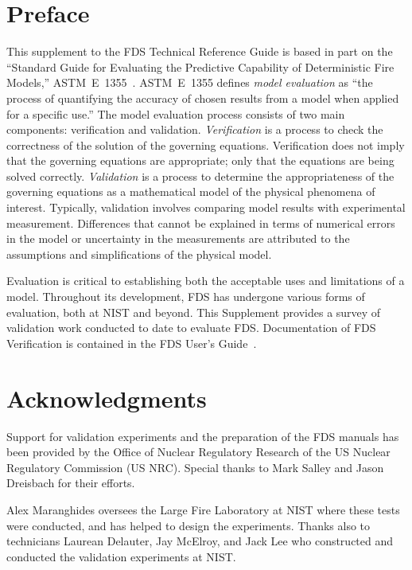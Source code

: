 \documentclass[11pt]{book}
\begin{document}
\chapter{Preface}


This supplement to the FDS Technical Reference Guide is based in part on the ``Standard Guide for
Evaluating the Predictive Capability of Deterministic Fire Models,'' ASTM~E~1355~\cite{ASTM:E1355}.
ASTM~E~1355 defines {\em model evaluation} as ``the process of quantifying
the accuracy of chosen results from a model when applied for a specific use.''
The model evaluation process consists of two main components: verification and validation.
{\em Verification} is a process to check the correctness of the solution of the
governing equations. Verification does not imply that the governing equations are
appropriate; only that the equations are being solved correctly.
{\em Validation} is a process to determine the appropriateness of the governing equations as a mathematical
model of the physical phenomena of interest. Typically, validation involves comparing
model results with experimental measurement. Differences that cannot be explained in terms of
numerical errors in the model or uncertainty in the measurements
are attributed to the assumptions and simplifications of the physical model.

Evaluation is critical to establishing both the acceptable uses
and limitations of a model. Throughout its development, FDS has undergone various forms of evaluation,
both at NIST and beyond. This Supplement provides a survey of validation work conducted to date to evaluate FDS.
Documentation of FDS Verification is contained in the FDS User's Guide~\cite{FDS_Users_Guide_5}.






\chapter{Acknowledgments}

\label{acksection}

Support for validation experiments and the preparation of the FDS
manuals has been provided by the Office of Nuclear Regulatory Research
of the US Nuclear Regulatory Commission (US NRC). Special thanks to
Mark Salley and Jason Dreisbach for their efforts.

Alex Maranghides oversees the Large Fire Laboratory at NIST where
these tests were conducted, and has helped to design the
experiments. Thanks also to technicians Laurean Delauter, Jay McElroy,
and Jack Lee who constructed and conducted the validation experiments
at NIST.
\end{document}
